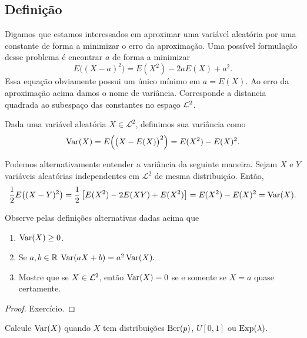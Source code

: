 \subsection{Definição}

Digamos que estamos interessados em aproximar uma variável aleatória por uma constante de forma a minimizar o erro da aproximação.
Uma possível formulação desse problema é encontrar $a$ de forma a minimizar
\begin{equation}
  \label{e:EX_aproxima}
  E\Big( (X - a)^2 \Big) = E(X^2) - 2 a E(X) + a^2.
\end{equation}
Essa equação obviamente possui um único mínimo em $a = E(X)$.
Ao erro da aproximação acima damos o nome de variância.
Corresponde a distancia quadrada ao subespaço das constantes no espaço ${\mathcal L}^2$.


\begin{definition}
  Dada uma variável aleatória $X \in \mathcal{L}^2$, definimos sua variância  como
  \begin{equation}
    \operatorname{Var}(X) = E \Big( \big(X - E(X)\big)^2 \Big) = E(X^2) - E(X)^2.
  \end{equation}
\end{definition}


Podemos alternativamente entender a variância da seguinte maneira.
Sejam $X$ e $Y$ variáveis aleatórias independentes em $\mathcal{L}^2$ de mesma distribuição.
Então,
\begin{equation}
  \frac{1}{2} E\big( (X - Y)^2 \big) = \frac{1}{2}\left[  E(X^2) - 2 E(XY) + E(X^2)\right] = E(X^2) - E(X)^2 = \operatorname{Var}(X).
\end{equation}


\begin{proposition}
Observe pelas definições alternativas dadas acima que
\begin{enumerate}[\quad a)]
\item $\operatorname{Var}(X) \geq 0$.
\item Se $a, b\in {\ensuremath{\mathbb R}}$ $\operatorname{Var} (aX+b)=a^2 \operatorname{Var}(X).$  
\item Mostre que se $X \in {\ensuremath{\mathcal L}}^2$, então $\operatorname{Var}(X) = 0$ se e somente se $X = a$ quase certamente.
\end{enumerate}
\end{proposition}

\begin{proof}
 Exercício.
\end{proof}


\begin{exercise}
  Calcule $\operatorname{Var}(X)$ quando $X$ tem distribuições $\operatorname{Ber}(p)$, $U[0,1]$ ou $\operatorname{Exp}(\lambda)$.
\end{exercise}

